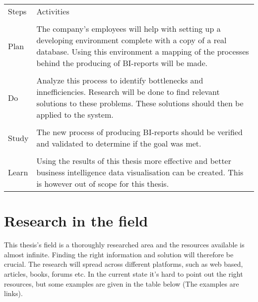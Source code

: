 \documentclass[12pt,a4paper]{article}
\begin{document}
\begin{table}[H]
\begin{tabular}{l p{14cm}}
 Steps & Activities \\ 
\\Plan & The company's employees will help with setting up a developing environment complete with a copy of a real database. Using this environment a mapping of the processes behind the producing of BI-reports will be made. \\ 
\\Do & Analyze this process to identify bottlenecks and innefficiencies. Research will be done to find relevant solutions to these problems. These solutions should then be applied to the system.\\
\\ Study & The new process of producing BI-reports should be verified and validated to determine if the goal was met.\\
\\ Learn & Using the results of this thesis more effective and better business intelligence data visualisation can be created. This is however out of scope for this thesis.
\end{tabular}
\end{table}


\section*{Research in the field}
This thesis's field is a thoroughly researched area and the resources available is almost infinite. Finding the right information and solution will therefore be crucial. The research will spread across different platforms, such as web based, articles, books, forums etc.  In the current state it's hard to point out the right resources, but some examples are given in the table below (The examples are links).
\end{document}

